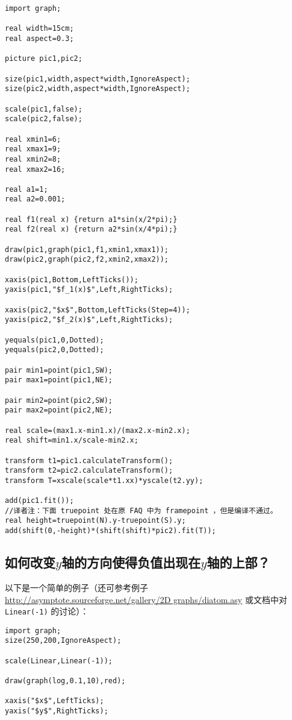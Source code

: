\begin{lstlisting}
import graph;

real width=15cm;
real aspect=0.3;

picture pic1,pic2;

size(pic1,width,aspect*width,IgnoreAspect);
size(pic2,width,aspect*width,IgnoreAspect);

scale(pic1,false);
scale(pic2,false);

real xmin1=6;
real xmax1=9;
real xmin2=8;
real xmax2=16;

real a1=1;
real a2=0.001;

real f1(real x) {return a1*sin(x/2*pi);}
real f2(real x) {return a2*sin(x/4*pi);}

draw(pic1,graph(pic1,f1,xmin1,xmax1));
draw(pic2,graph(pic2,f2,xmin2,xmax2));

xaxis(pic1,Bottom,LeftTicks());
yaxis(pic1,"$f_1(x)$",Left,RightTicks);

xaxis(pic2,"$x$",Bottom,LeftTicks(Step=4));
yaxis(pic2,"$f_2(x)$",Left,RightTicks);

yequals(pic1,0,Dotted);
yequals(pic2,0,Dotted);

pair min1=point(pic1,SW);
pair max1=point(pic1,NE);

pair min2=point(pic2,SW);
pair max2=point(pic2,NE);

real scale=(max1.x-min1.x)/(max2.x-min2.x);
real shift=min1.x/scale-min2.x;

transform t1=pic1.calculateTransform();
transform t2=pic2.calculateTransform();
transform T=xscale(scale*t1.xx)*yscale(t2.yy);

add(pic1.fit());
//译者注：下面 truepoint 处在原 FAQ 中为 framepoint ，但是编译不通过。
real height=truepoint(N).y-truepoint(S).y;
add(shift(0,-height)*(shift(shift)*pic2).fit(T));
\end{lstlisting}

\subsection{\label{Q6.15}如何改变$y$轴的方向使得负值出现在$y$轴的上部？}
以下是一个简单的例子（还可参考例子 \url{http://asymptote.sourceforge.net/gallery/2D graphs/diatom.asy}
或文档中对 \verb|Linear(-1)| 的讨论）：

\begin{lstlisting}
import graph;
size(250,200,IgnoreAspect);

scale(Linear,Linear(-1));

draw(graph(log,0.1,10),red);

xaxis("$x$",LeftTicks);
yaxis("$y$",RightTicks);
\end{lstlisting}

